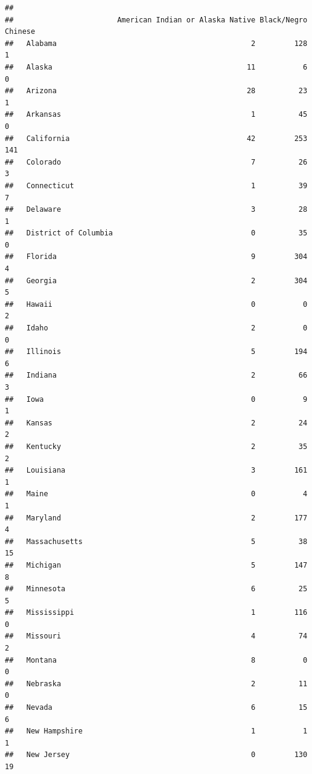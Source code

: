 \documentclass[
]{book}
\theoremstyle{definition}
\theoremstyle{definition}
\theoremstyle{definition}
\theoremstyle{definition}
\theoremstyle{remark}
\begin{document}
\begin{verbatim}
##                       
##                        American Indian or Alaska Native Black/Negro Chinese
##   Alabama                                             2         128       1
##   Alaska                                             11           6       0
##   Arizona                                            28          23       1
##   Arkansas                                            1          45       0
##   California                                         42         253     141
##   Colorado                                            7          26       3
##   Connecticut                                         1          39       7
##   Delaware                                            3          28       1
##   District of Columbia                                0          35       0
##   Florida                                             9         304       4
##   Georgia                                             2         304       5
##   Hawaii                                              0           0       2
##   Idaho                                               2           0       0
##   Illinois                                            5         194       6
##   Indiana                                             2          66       3
##   Iowa                                                0           9       1
##   Kansas                                              2          24       2
##   Kentucky                                            2          35       2
##   Louisiana                                           3         161       1
##   Maine                                               0           4       1
##   Maryland                                            2         177       4
##   Massachusetts                                       5          38      15
##   Michigan                                            5         147       8
##   Minnesota                                           6          25       5
##   Mississippi                                         1         116       0
##   Missouri                                            4          74       2
##   Montana                                             8           0       0
##   Nebraska                                            2          11       0
##   Nevada                                              6          15       6
##   New Hampshire                                       1           1       1
##   New Jersey                                          0         130      19

\end{verbatim}
\end{document}
